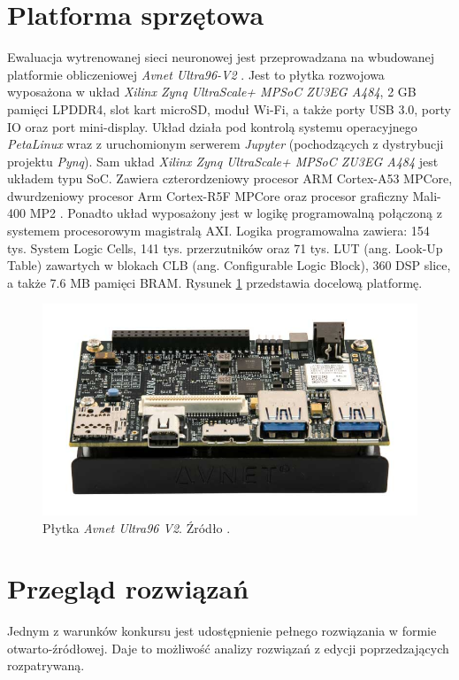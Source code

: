 \section{Platforma sprzętowa}
Ewaluacja wytrenowanej sieci neuronowej jest przeprowadzana na wbudowanej platformie obliczeniowej \emph{Avnet Ultra96-V2} \cite{avnet_ultra96}. Jest to płytka rozwojowa wyposażona w układ \emph{Xilinx Zynq UltraScale+ MPSoC ZU3EG A484}, 2 GB pamięci LPDDR4, slot kart microSD, moduł Wi-Fi, a także porty USB 3.0, porty IO oraz port mini-display. Układ działa pod kontrolą systemu operacyjnego \emph{PetaLinux} wraz z uruchomionym serwerem \emph{Jupyter} (pochodzących z dystrybucji projektu \emph{Pynq}\cite{pynq}). 
Sam układ \emph{Xilinx Zynq UltraScale+ MPSoC ZU3EG A484} jest układem typu SoC. Zawiera czterordzeniowy procesor ARM Cortex-A53 MPCore, dwurdzeniowy procesor Arm Cortex-R5F MPCore oraz procesor graficzny Mali-400 MP2 \cite{zynq_product_guide}. Ponadto układ wyposażony jest w logikę programowalną połączoną z systemem procesorowym magistralą AXI. Logika programowalna zawiera: 154 tys. System Logic Cells, 141 tys. przerzutników oraz 71 tys. LUT (ang. Look-Up Table) zawartych w blokach CLB (ang. Configurable Logic Block), 360 DSP slice, a także 7.6 MB pamięci BRAM. Rysunek \ref{fig:ultra96} przedstawia docelową platformę.

\begin{figure}
    \centering
    \includegraphics[width=\linewidth]{images/ultra96v2.png}
    \caption{Płytka \emph{Avnet Ultra96 V2}. Źródło \cite{avnet_ultra96}.}
    \label{fig:ultra96}
\end{figure}
 

\section{Przegląd rozwiązań}
Jednym z warunków konkursu jest udostępnienie pełnego rozwiązania w formie otwarto-źródłowej. 
Daje to możliwość analizy rozwiązań z edycji poprzedzających rozpatrywaną.

